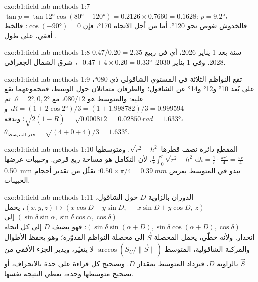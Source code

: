 \begin{solution}{exo:b1:field-lab-methods-1:7}
$\tan p = \tan\ang{12}\cos(\ang{80} - \ang{120}) = 0.2126\times0.7660 =
0.1628$: $p = \ang{9.2}$، فالخدوش تغوص نحو \ang{120}. أما من أجل الاتجاه \ang{170}، فإن $\cos(\ang{-90}) = 0$: فالخط أفقي، على طول .
\end{solution}

\begin{solution}{exo:b1:field-lab-methods-1:8}
$0.47/0.20 = 2.35$ سنة بعد 1 يناير 2026، أي في ربيع 2028. وفي 1 يناير 2030: $-0.47 + 4\times0.20 = \ang{+0.33}$، شرق الشمال الجغرافي.
\end{solution}

\begin{solution}{exo:b1:field-lab-methods-1:9}
تقع النواظم الثلاثة في المستوي الشاقولي ذي  \ang{080}، على بُعد \ang{10} و\ang{12} و\ang{14} عن الشاقول؛ والطرفان متماثلان حول الوسط، فمجموعهما يقع عليه: والمتوسط هو $080/12$، مع $\theta = \ang{2}, 0, \ang{2}$. ثم $\bar R = (1 +
2\cos\ang{2})/3 = (1 + 1.998782)/3 = 0.999594$، و$\sqrt{2(1 - \bar R)} =
\sqrt{0.000812} = \qty{0.02850}{rad} = \ang{1.633}$؛ وبدقة، $\theta_{\text{جذر المتوسط}} = \sqrt{(4 + 0 + 4)/3} = \ang{1.633}$.
\end{solution}

\begin{solution}{exo:b1:field-lab-methods-1:10}
المقطع دائرة نصف قطرها $\sqrt{r^2 - h^2}$. ومتوسطها
$\frac1r\int_0^r\sqrt{r^2 - h^2}\,\mathrm dh = \frac1r\cdot\frac{\pi r^2}{4}
= \frac{\pi r}{4}$، لأن التكامل هو مساحة ربع قرص. وحبيبات عرضها \qty{0.50}{mm} تبدو في المتوسط بعرض $0.50\times\pi/4 = \qty{0.39}{mm}$:  تقلّل من تقدير أحجام الحبيبات.
\end{solution}

\begin{solution}{exo:b1:field-lab-methods-1:11}
الدوران بالزاوية $D$ حول الشاقول،
$(x, y, z) \mapsto (x\cos D + y\sin D,\ -x\sin D + y\cos D,\ z)$، يحمل
$(\sin\delta\sin\alpha, \sin\delta\cos\alpha, \cos\delta)$ إلى
$(\sin\delta\sin(\alpha + D), \sin\delta\cos(\alpha + D), \cos\delta)$: فهو يضيف $D$ إلى كل اتجاه انحدار. ولأنه خطّي، يحمل المحصلة $\vec S$ إلى محصلة النواظم المدوّرة؛ وهو يحفظ الأطوال والمركبة الشاقولية،  المتوسط $\arccos(S_U/\|\vec S\|)$ لا يتغيّر، ويدير الجزء الأفقي من $\vec S$ بالزاوية $D$، فيزداد  المتوسط بمقدار $D$. وتصحيح كل قراءة على حدة بالانحراف، أو تصحيح متوسطها وحده، يعطي النتيجة نفسها.
\end{solution}

